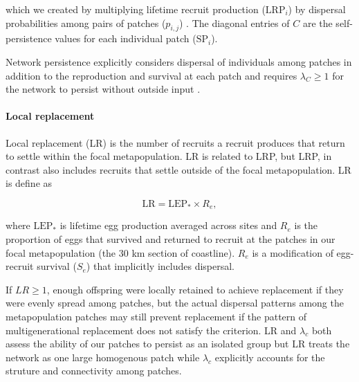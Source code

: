 \documentclass[12pt, oneside]{article}   	%
\begin{document}
which we created by multiplying lifetime recruit production ($\text{LRP}_i$) by dispersal probabilities among pairs of patches ($p_{i,j}$) \citep{burgess2014beyond}. The diagonal entries of $C$ are the self-persistence values for each individual patch ($\text{SP}_i$).

Network persistence explicitly considers dispersal of individuals among patches in addition to the reproduction and survival at each patch and requires $\lambda_C \geq 1$ for the network to persist without outside input \citep{hastings_persistence_2006, white_population_2010, burgess2014beyond}.

\paragraph*{Local replacement}

Local replacement (LR) is the number of recruits a recruit produces that return to settle within the focal metapopulation. LR is related to LRP, but LRP, in contrast also includes recruits that settle outside of the focal metapopulation. LR is define as 

\begin{equation}
\text{LR} = \text{LEP}_* \times R_e, \label{EQN_LR}
\end{equation}

where $\text{LEP}_*$ is lifetime egg production averaged across sites and $R_e$ is the proportion of eggs that survived and returned to recruit at the patches in our focal metapopulation (the 30 km section of coastline). $R_e$ is a modification of egg-recruit survival ($S_e$) that implicitly includes dispersal. 

If $LR \geq 1$, enough offspring were locally retained to achieve replacement if they were evenly spread among patches, but the actual dispersal patterns among the metapopulation patches may still prevent replacement if the pattern of multigenerational replacement does not satisfy the \cite{hastings_persistence_2006} criterion. LR and $\lambda_c$ both assess the ability of our patches to persist as an isolated group but LR treats the network as one large homogenous patch while $\lambda_c$ explicitly accounts for the struture and connectivity among patches.  
\end{document}
